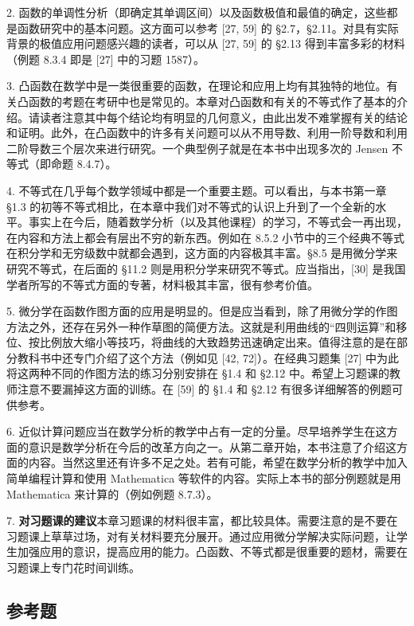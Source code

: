 2. 函数的单调性分析（即确定其单调区间）以及函数极值和最值的确定，这些都是函数研究中的基本问题。这方面可以参考 [27, 59] 的 §2.7，§2.11。对具有实际背景的极值应用问题感兴趣的读者，可以从 [27, 59] 的 §2.13 得到丰富多彩的材料（例题 8.3.4 即是 [27] 中的习题 1587）。

3. 凸函数在数学中是一类很重要的函数，在理论和应用上均有其独特的地位。有关凸函数的考题在考研中也是常见的。本章对凸函数和有关的不等式作了基本的介绍。请读者注意其中每个结论均有明显的几何意义，由此出发不难掌握有关的结论和证明。此外，在凸函数中的许多有关问题可以从不用导数、利用一阶导数和利用二阶导数三个层次来进行研究。一个典型例子就是在本书中出现多次的 Jensen 不等式（即命题 8.4.7）。

4. 不等式在几乎每个数学领域中都是一个重要主题。可以看出，与本书第一章 §1.3 的初等不等式相比，在本章中我们对不等式的认识上升到了一个全新的水平。事实上在今后，随着数学分析（以及其他课程）的学习，不等式会一再出现，在内容和方法上都会有层出不穷的新东西。例如在 8.5.2 小节中的三个经典不等式在积分学和无穷级数中就都会遇到，这方面的内容极其丰富。§8.5 是用微分学来研究不等式，在后面的 §11.2 则是用积分学来研究不等式。应当指出，[30] 是我国学者所写的不等式方面的专著，材料极其丰富，很有参考价值。

5. 微分学在函数作图方面的应用是明显的。但是应当看到，除了用微分学的作图方法之外，还存在另外一种作草图的简便方法。这就是利用曲线的“四则运算”和移位、按比例放大缩小等技巧，将曲线的大致趋势迅速确定出来。值得注意的是在部分教科书中还专门介绍了这个方法（例如见 [42, 72]）。在经典习题集 [27] 中为此将这两种不同的作图方法的练习分别安排在 §1.4 和 §2.12 中。希望上习题课的教师注意不要漏掉这方面的训练。在 [59] 的 §1.4 和 §2.12 有很多详细解答的例题可供参考。

6. 近似计算问题应当在数学分析的教学中占有一定的分量。尽早培养学生在这方面的意识是数学分析在今后的改革方向之一。从第二章开始，本书注意了介绍这方面的内容。当然这里还有许多不足之处。若有可能，希望在数学分析的教学中加入简单编程计算和使用 Mathematica 等软件的内容。实际上本书的部分例题就是用 Mathematica 来计算的（例如例题 8.7.3）。

7. \textbf{对习题课的建议}\quad 本章习题课的材料很丰富，都比较具体。需要注意的是不要在习题课上草草过场，对有关材料要充分展开。通过应用微分学解决实际问题，让学生加强应用的意识，提高应用的能力。凸函数、不等式都是很重要的题材，需要在习题课上专门花时间训练。

\subsection{参考题}

